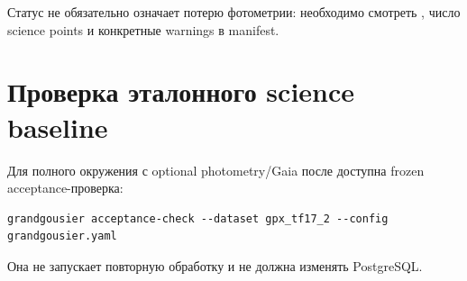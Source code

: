 Статус  не обязательно означает потерю фотометрии: необходимо смотреть , число science points и конкретные warnings в manifest.

\section{Проверка эталонного science baseline}

Для полного окружения с optional photometry/Gaia после  доступна frozen acceptance-проверка:

\begin{lstlisting}
grandgousier acceptance-check --dataset gpx_tf17_2 --config grandgousier.yaml
\end{lstlisting}

Она не запускает повторную обработку и не должна изменять PostgreSQL.
